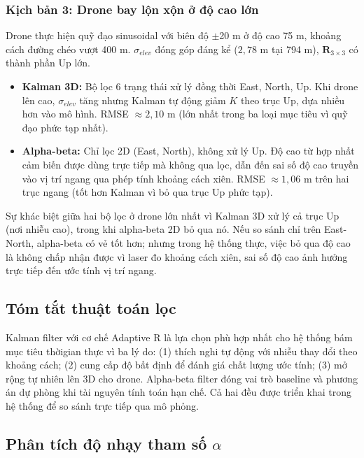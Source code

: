 \subsubsection{Kịch bản 3: Drone bay lộn xộn ở độ cao lớn}

\hspace{0.5cm} Drone thực hiện quỹ đạo sinusoidal với biên độ $\pm$20 m ở độ cao 75 m, khoảng cách đường chéo vượt 400 m. $\sigma_{elev}$ đóng góp đáng kể ($2{,}78$ m tại 794 m), $\mathbf{R}_{3\times3}$ có thành phần Up lớn.

\begin{itemize}
    \item \textbf{Kalman 3D:} Bộ lọc 6 trạng thái xử lý đồng thời East, North, Up. Khi drone lên cao, $\sigma_{elev}$ tăng nhưng Kalman tự động giảm $K$ theo trục Up, dựa nhiều hơn vào mô hình. RMSE $\approx 2{,}10$ m (lớn nhất trong ba loại mục tiêu vì quỹ đạo phức tạp nhất).
    \item \textbf{Alpha-beta:} Chỉ lọc 2D (East, North), không xử lý Up. Độ cao từ hợp nhất cảm biến được dùng trực tiếp mà không qua lọc, dẫn đến sai số độ cao truyền vào vị trí ngang qua phép tính khoảng cách xiên. RMSE $\approx 1{,}06$ m trên hai trục ngang (tốt hơn Kalman vì bỏ qua trục Up phức tạp).
\end{itemize}

Sự khác biệt giữa hai bộ lọc ở drone lớn nhất vì Kalman 3D xử lý cả trục Up (nơi nhiễu cao), trong khi alpha-beta 2D bỏ qua nó. Nếu so sánh chỉ trên East-North, alpha-beta có vẻ tốt hơn; nhưng trong hệ thống thực, việc bỏ qua độ cao là không chấp nhận được vì laser đo khoảng cách xiên, sai số độ cao ảnh hưởng trực tiếp đến ước tính vị trí ngang.

\subsection{Tóm tắt thuật toán lọc}

\hspace{0.5cm} Kalman filter với cơ chế Adaptive R là lựa chọn phù hợp nhất cho hệ thống bám mục tiêu thờigian thực vì ba lý do: (1) thích nghi tự động với nhiễu thay đổi theo khoảng cách; (2) cung cấp độ bất định để đánh giá chất lượng ước tính; (3) mở rộng tự nhiên lên 3D cho drone. Alpha-beta filter đóng vai trò baseline và phương án dự phòng khi tài nguyên tính toán hạn chế. Cả hai đều được triển khai trong hệ thống để so sánh trực tiếp qua mô phỏng.

\subsection{Phân tích độ nhạy tham số \texorpdfstring{$\alpha$}{alpha}}

